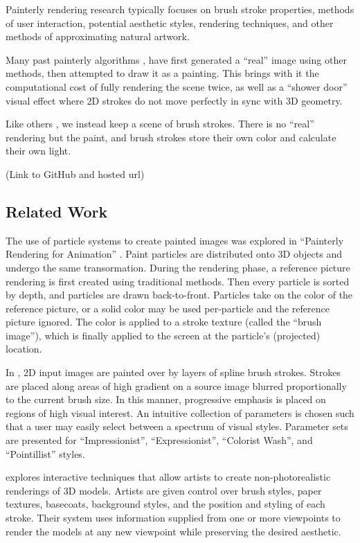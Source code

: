 \documentclass[conference]{acmsiggraph}
\begin{document}
Painterly rendering research typically focuses on brush stroke properties,
methods of user interaction, potential aesthetic styles, rendering techniques,
and other methods of approximating natural artwork.

Many past painterly algorithms \cite{Hertzmann:1998:PRC:280814.280951},
\cite{Lu:2010:IPS:1730804.1730825} have first generated a ``real'' image using
other methods, then attempted to draw it as a painting. This brings with it the
computational cost of fully rendering the scene twice, as well as a
``shower door'' visual effect where 2D strokes do not move perfectly in sync
with 3D geometry.

Like others \cite{Meier:1996:PRA:237170.237288}, we instead keep a scene of
brush strokes. There is no ``real'' rendering but the paint, and brush strokes
store their own color and calculate their own light.

(Link to GitHub and hosted url)


\subsection{Related Work}

The use of particle systems to create painted images was explored in
``Painterly Rendering for Animation'' \cite{Meier:1996:PRA:237170.237288}.
Paint particles are distributed onto 3D objects and undergo the same
transormation. During the rendering phase, a reference picture rendering is
first created using traditional methods. Then every particle is sorted by
depth, and particles are drawn back-to-front. Particles take on the color of
the reference picture, or a solid color may be used per-particle and the
reference picture ignored. The color is applied to a stroke texture (called
the ``brush image''), which is finally applied to the screen at the particle's
(projected) location.

In \cite{Hertzmann:1998:PRC:280814.280951}, 2D input images are painted over
by layers of spline brush strokes. Strokes are placed along areas of high
gradient on a source image blurred proportionally to the current brush size. In
this manner, progressive emphasis is  placed on regions of high visual
interest. An intuitive collection of parameters is chosen such that a user may
easily select between a spectrum of visual styles. Parameter sets are presented
for ``Impressionist'', ``Expressionist'', ``Colorist Wash'', and ``Pointillist''
styles.

\cite{Kalnins:2002:WND:566570.566648} explores interactive techniques that
allow artists to create non-photorealistic renderings of 3D models. Artists are
given control over brush styles, paper textures, basecoats, background styles,
and the position and styling of each stroke. Their system uses information
supplied from one or more viewpoints to render the models at any new viewpoint
while preserving the desired aesthetic.
\end{document}
